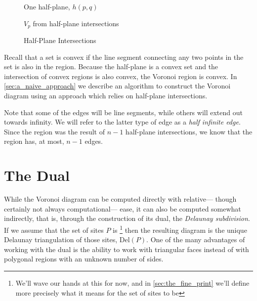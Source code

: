 \documentclass[12pt,twoside]{reedthesis}
\begin{document}
    \begin{figure}[!htb]
      \centering
      \begin{subtable}{.475\textwidth}
        
        \caption{One half-plane, $h(p, q)$}
        \label{fig:one_half_plane}
      \end{subtable}%
      \begin{subtable}{.475\textwidth}
      \centering
        
        \caption{$V_{p}$ from half-plane intersections}
        \label{fig:all_half_planes}
      \end{subtable}
      \caption{Half-Plane Intersections}
      \label{fig:half_planes}
    \end{figure}
    Recall that a set is convex if the line segment connecting any two points in the set is also in the region. Because the half-plane is a convex set and the intersection of convex regions is also convex, the Voronoi region is convex. In \cref{sec:a_naive_approach} we describe an algorithm to construct the Voronoi diagram using an approach which relies on half-plane intersections.\par


    Note that some of the edges will be line segments, while others will extend out towards infinity. We will refer to the latter type of edge as a \emph{half infinite edge}. Since the region was the result of $n-1$ half-plane intersections, we know that the region has, at most, $n-1$ edges. \par


  \section{The Dual} %
  \label{sec:the_dual}
    While the Voronoi diagram can be computed directly with relative--- though certainly not always computational--- ease, it can also be computed somewhat indirectly, that is, through the construction of its dual, the \emph{Delaunay subdivision}. If we assume that the set of sites $P$ is \footnote{We'll wave our hands at this for now, and in \cref{sec:the_fine_print} we'll define more precisely what it means for the set of sites to be } then the resulting diagram is the unique Delaunay triangulation of those sites, $\mbox{Del}(P)$. One of the many advantages of working with the dual is the ability to work with triangular faces instead of with polygonal regions with an unknown number of sides. \par
\end{document}
